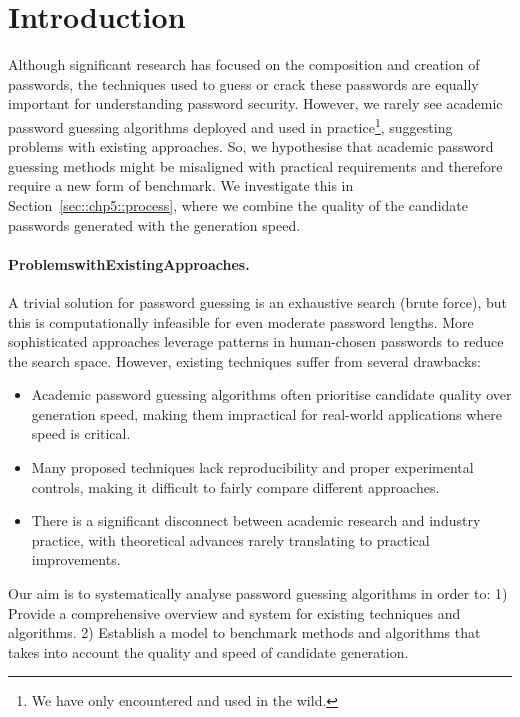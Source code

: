 \section{Introduction}
\label{sec::chp5::introduction}

Although significant research has focused on the composition and creation of passwords, the techniques used to guess or crack these passwords are equally important for understanding password security. However, we rarely see academic password guessing algorithms deployed and used in practice\footnote{We have only encountered \markovngram and \pcfg used in the wild.}, suggesting problems with existing approaches. So, we hypothesise that academic password guessing methods might be misaligned with practical requirements and therefore require a new form of benchmark. We investigate this in Section~\ref{sec::chp5::process}, where we combine the quality of the candidate passwords generated with the generation speed.

\paragraph{Problems\;with\;Existing\;Approaches.}\;A trivial solution for password guessing is an exhaustive search (brute force), but this is computationally infeasible for even moderate password lengths. More sophisticated approaches leverage patterns in human-chosen passwords to reduce the search space. However, existing techniques suffer from several drawbacks:

\begin{itemize}
\item Academic password guessing algorithms often prioritise candidate quality over generation speed, making them impractical for real-world applications where speed is critical.
\item Many proposed techniques lack reproducibility and proper experimental controls, making it difficult to fairly compare different approaches.
\item There is a significant disconnect between academic research and industry practice, with theoretical advances rarely translating to practical improvements.
\end{itemize}

Our aim is to systematically analyse password guessing algorithms in order to: 1) Provide a comprehensive overview and system for existing techniques and algorithms. 2) Establish a model to benchmark methods and algorithms that takes into account the quality and speed of candidate generation.



